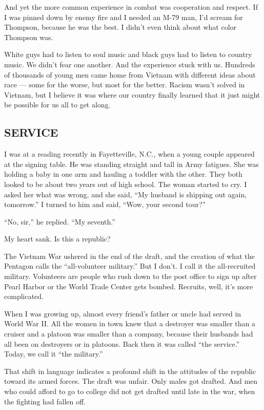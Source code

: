 And yet the more common experience in combat was cooperation and
respect. If I was pinned down by enemy fire and I needed an M-79 man,
I'd scream for Thompson, because he was the best. I didn't even think
about what color Thompson was.

White guys had to listen to soul music and black guys had to listen to
country music. We didn't fear one another. And the experience stuck with
us. Hundreds of thousands of young men came home from Vietnam with
different ideas about race --- some for the worse, but most for the
better. Racism wasn't solved in Vietnam, but I believe it was where our
country finally learned that it just might be possible for us all to get
along.

\hypertarget{service}{%
\subsection{\texorpdfstring{\textbf{SERVICE}}{SERVICE}}\label{service}}

I was at a reading recently in Fayetteville, N.C., when a young couple
appeared at the signing table. He was standing straight and tall in Army
fatigues. She was holding a baby in one arm and hauling a toddler with
the other. They both looked to be about two years out of high school.
The woman started to cry. I asked her what was wrong, and she said, ``My
husband is shipping out again, tomorrow.'' I turned to him and said,
``Wow, your second tour?''

``No, sir,'' he replied. ``My seventh.''

My heart sank. Is this a republic?

The Vietnam War ushered in the end of the draft, and the creation of
what the Pentagon calls the ``all-volunteer military.'' But I don't. I
call it the all-recruited military. Volunteers are people who rush down
to the post office to sign up after Pearl Harbor or the World Trade
Center gets bombed. Recruits, well, it's more complicated.

When I was growing up, almost every friend's father or uncle had served
in World War II. All the women in town knew that a destroyer was smaller
than a cruiser and a platoon was smaller than a company, because their
husbands had all been on destroyers or in platoons. Back then it was
called ``the service.'' Today, we call it ``the military.''

That shift in language indicates a profound shift in the attitudes of
the republic toward its armed forces. The draft was unfair. Only males
got drafted. And men who could afford to go to college did not get
drafted until late in the war, when the fighting had fallen off.

